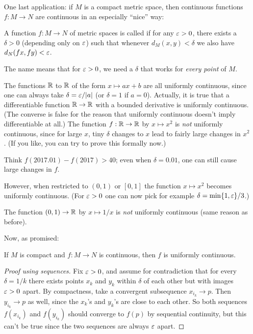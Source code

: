 One last application: if $M$ is a compact metric space,
then continuous functions $f : M \to N$
are continuous in an especially ``nice'' way:
\begin{definition}
	A function $f : M \to N$ of metric spaces
	is called 
	if for any $\varepsilon > 0$, there exists a $\delta > 0$
	(depending only on $\varepsilon$) such that 
	whenever $d_M(x,y) < \delta$ we also have $d_N(fx, fy) < \varepsilon$.
\end{definition}
The name means that for $\varepsilon > 0$,
we need a $\delta$ that works for \emph{every point} of $M$.
\begin{example}
	\listhack
	\begin{enumerate}[(a)]
		\ii The functions $\mathbb R$ to $\mathbb R$ of the form
		$x \mapsto ax+b$ are all uniformly continuous,
		since one can always take $\delta = \varepsilon/|a|$ (or $\delta=1$ if $a=0$).
		\ii Actually, it is true that a differentiable function $\mathbb R \to \mathbb R$
		with a bounded derivative is uniformly continuous.
		(The converse is false for the reason that uniformly continuous
		doesn't imply differentiable at all.)
		\ii The function $f : \mathbb R \to \mathbb R$ by $x \mapsto x^2$
		is \emph{not} uniformly continuous, since for large $x$,
		tiny $\delta$ changes to $x$ lead to fairly large changes in $x^2$.
		(If you like, you can try to prove this formally now.)
		
		Think $f(2017.01) - f(2017) > 40$;
		even when $\delta = 0.01$, one can still cause large changes in $f$.

		\ii However, when restricted to $(0,1)$ or $[0,1]$
		the function $x \mapsto x^2$ becomes uniformly continuous.
		(For $\varepsilon > 0$ one can now pick for example $\delta = \min\{1,\varepsilon\}/3$.)

		\ii The function $(0,1) \to \mathbb R$ by $x \mapsto 1/x$ is \emph{not}
		uniformly continuous (same reason as before).
	\end{enumerate}
\end{example}

Now, as promised:
\begin{proposition}
	If $M$ is compact and $f \colon M \to N$ is continuous,
	then $f$ is uniformly continuous.
\end{proposition}
\begin{proof}[Proof using sequences]
	Fix $\varepsilon > 0$, and assume for contradiction that for every $\delta = 1/k$
	there exists points $x_k$ and $y_k$ within $\delta$ of each
	other but with images $\varepsilon > 0$ apart.
	By compactness, take a convergent subsequence $x_{i_k} \to p$.
	Then $y_{i_k} \to p$ as well, since the $x_k$'s and $y_k$'s are close to each other.
	So both sequences $f(x_{i_k})$ and $f(y_{i_k})$ should converge to $f(p)$ by sequential continuity,
	but this can't be true since the two sequences are always $\varepsilon$ apart.
\end{proof}

